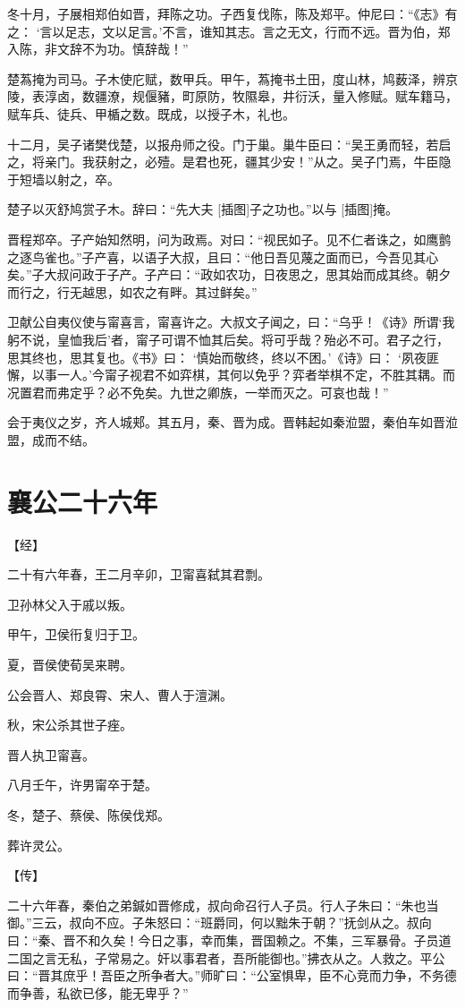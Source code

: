 \documentclass[a4paper,12pt,UTF8,twoside]{ctexbook}
\begin{document}
冬十月，子展相郑伯如晋，拜陈之功。子西复伐陈，陈及郑平。仲尼曰：“《志》有之： ‘言以足志，文以足言。’不言，谁知其志。言之无文，行而不远。晋为伯，郑入陈，非文辞不为功。慎辞哉！”

楚蒍掩为司马。子木使庀赋，数甲兵。甲午，蒍掩书土田，度山林，鸠薮泽，辨京陵，表淳卤，数疆潦，规偃豬，町原防，牧隰皋，井衍沃，量入修赋。赋车籍马，赋车兵、徒兵、甲楯之数。既成，以授子木，礼也。

十二月，吴子诸樊伐楚，以报舟师之役。门于巢。巢牛臣曰：“吴王勇而轻，若启之，将亲门。我获射之，必殪。是君也死，疆其少安！”从之。吴子门焉，牛臣隐于短墙以射之，卒。

楚子以灭舒鸠赏子木。辞曰：“先大夫 [插图]子之功也。”以与 [插图]掩。

晋程郑卒。子产始知然明，问为政焉。对曰：“视民如子。见不仁者诛之，如鹰鹯之逐鸟雀也。”子产喜，以语子大叔，且曰：“他日吾见蔑之面而已，今吾见其心矣。”子大叔问政于子产。子产曰：“政如农功，日夜思之，思其始而成其终。朝夕而行之，行无越思，如农之有畔。其过鲜矣。”

卫献公自夷仪使与甯喜言，甯喜许之。大叔文子闻之，曰：“乌乎！《诗》所谓‘我躬不说，皇恤我后’者，甯子可谓不恤其后矣。将可乎哉？殆必不可。君子之行，思其终也，思其复也。《书》曰： ‘慎始而敬终，终以不困。’《诗》曰： ‘夙夜匪懈，以事一人。’今甯子视君不如弈棋，其何以免乎？弈者举棋不定，不胜其耦。而况置君而弗定乎？必不免矣。九世之卿族，一举而灭之。可哀也哉！”

会于夷仪之岁，齐人城郏。其五月，秦、晋为成。晋韩起如秦涖盟，秦伯车如晋涖盟，成而不结。


\chapter{襄公二十六年}


【经】

二十有六年春，王二月辛卯，卫甯喜弑其君剽。

卫孙林父入于戚以叛。

甲午，卫侯衎复归于卫。

夏，晋侯使荀吴来聘。

公会晋人、郑良霄、宋人、曹人于澶渊。

秋，宋公杀其世子痤。

晋人执卫甯喜。

八月壬午，许男甯卒于楚。

冬，楚子、蔡侯、陈侯伐郑。

葬许灵公。

【传】

二十六年春，秦伯之弟鍼如晋修成，叔向命召行人子员。行人子朱曰：“朱也当御。”三云，叔向不应。子朱怒曰：“班爵同，何以黜朱于朝？”抚剑从之。叔向曰：“秦、晋不和久矣！今日之事，幸而集，晋国赖之。不集，三军暴骨。子员道二国之言无私，子常易之。奸以事君者，吾所能御也。”拂衣从之。人救之。平公曰：“晋其庶乎！吾臣之所争者大。”师旷曰：“公室惧卑，臣不心竞而力争，不务德而争善，私欲已侈，能无卑乎？”
\end{document}
